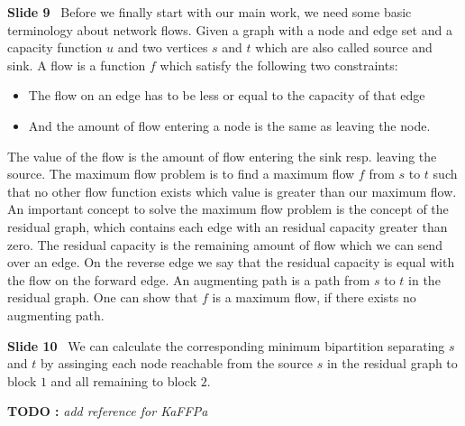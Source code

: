 \documentclass[11pt]{llncs}
\newcounter{todocount}
\newcommand{\todo}[1]{{\color{red}\textbf{TODO \the\value{todocount}:}
        \emph{#1} \addtocounter{todocount}{1}}}
\newcommand{\fakepar}[1]{\medskip\par\textbf{#1}\ }
\begin{document}
\fakepar{Slide 9} Before we finally start with our main work, we need some basic terminology about
network flows. Given a graph with a node and edge set and a capacity function $u$ and two vertices
$s$ and $t$ which are also called source and sink. A flow is a function $f$ which satisfy 
the following two constraints:
\begin{itemize}
\item The flow on an edge has to be less or equal to the capacity of that edge
\item And the amount of flow entering a node is the same as leaving the node.
\end{itemize}
The value of the flow is the amount of flow entering the sink resp. leaving the source.
The maximum flow problem is to find a maximum flow $f$ from $s$ to $t$ such that no other flow
function exists which value is greater than our maximum flow. An important concept to solve
the maximum flow problem is the concept of the residual graph, which contains each
edge with an residual capacity greater than zero. The residual capacity is the remaining amount
of flow which we can send over an edge. On the reverse edge we say that the residual capacity
is equal with the flow on the forward edge. An augmenting path is a path from $s$ to $t$
in the residual graph. One can show that $f$ is a maximum flow, if there exists no augmenting path.

\fakepar{Slide 10} We can calculate the corresponding minimum bipartition separating $s$ and $t$
by assinging each node reachable from the source $s$ in the residual graph to block $1$ and all 
remaining to block $2$.

\todo{add reference for KaFFPa}
\end{document}
